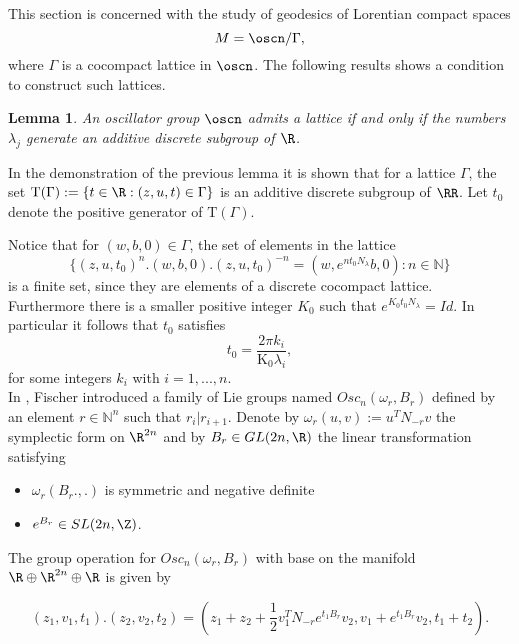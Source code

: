 \documentclass[11pt]{amsart}
\theoremstyle{plain}
\newtheorem{lem}[thm]{Lemma}
\theoremstyle{definition}
\theoremstyle{remark}
\begin{document}
	This section is concerned with the study of geodesics of Lorentian compact spaces  $$M=\oscn/ \Gamma,$$ where $\Gamma$ is a cocompact lattice in $\oscn$. The following results shows a condition to construct such lattices. 
	
	\begin{lem}\cite{MeRe}\label{lema_medina}
		An oscillator group $\oscn$ admits a lattice if and only if the numbers $\lambda_j$ generate an additive discrete subgroup of $\R$.
	\end{lem}
	
	In the demonstration of the previous lemma it is  shown that for a lattice $\Gamma$, the set $\mathrm{T}(\Gamma):=\{ t \in \R : (z,u,t) \in \Gamma \}$ is an additive discrete subgroup of $\RR$. %
	 Let $t_0$ denote the positive generator of $\mathrm{T}(\Gamma)$. 
	
	Notice that for $(w,b,0) \in \Gamma$, the set of elements in the lattice
	\begin{equation*}
		\{ (z,u,t_0)^n.(w,b,0).(z,u,t_0)^{-n}=(w,e^{n t_0 N_{\lambda}}b,0) : n \in \mathbb{N} \}
	\end{equation*}
	 is a finite set, since they are elements of a discrete cocompact lattice. Furthermore there is a smaller positive integer $K_0$ such that $e^{K_0 t_0 N_{\lambda}} = Id$. In particular it follows that $t_0$ satisfies
	\begin{equation} \label{oscilator-N}
		t_0=\frac{2 \pi k_i}{\mathrm{K_0} \lambda_i},
	\end{equation}
	for some integers $k_i$ with $i=1, ..., n$.\\
	
	In \cite{MF}, Fischer introduced a family of Lie groups named $Osc_n(\omega_r, B_r)$ defined by an element $r \in \mathbb{N}^n$ such that $r_i | r_{i+1}$. Denote by $\omega_r(u,v):=u^TN_{-r}v$ the symplectic form on $\R^{2n}$ and by $B_r \in GL(2n, \R)$ the linear transformation satisfying
	
	\begin{itemize}
		\item $\omega_r(B_r.,.)$ is symmetric and negative definite
		\item $e^{B_r} \in SL(2n,\Z)$.
	\end{itemize}
	
	The group operation for $Osc_n(\omega_r, B_r)$ with base on the manifold $\R \oplus \R^{2n} \oplus \R$ is given by
	
	\begin{equation}
		(z_1,v_1,t_1) . (z_2,v_2,t_2)=(z_1+z_2+\frac{1}{2}v_1^{T}N_{-r} e^{t_1 B_r}v_2,v_1+e^{t_1 B_r}v_2,t_1+t_2).
	\end{equation}
	
\end{document}
